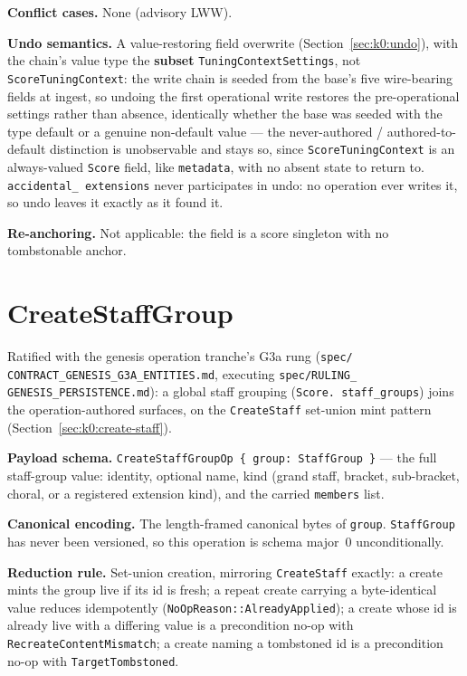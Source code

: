 \documentclass[11pt,letterpaper]{report}
\begin{document}
\textbf{Conflict cases.} None (advisory LWW).

\textbf{Undo semantics.} A value-restoring field overwrite
(Section~\ref{sec:k0:undo}), with the chain's value type the \textbf{subset}
\texttt{TuningContextSettings}, not \texttt{ScoreTuningContext}: the write
chain is seeded from the base's five wire-bearing fields at ingest, so
undoing the first operational write restores the pre-operational settings
rather than absence, identically whether the base was seeded with the type
default or a genuine non-default value --- the never-authored /
authored-to-default distinction is unobservable and stays so, since
\texttt{ScoreTuningContext} is an always-valued \texttt{Score} field, like
\texttt{metadata}, with no absent state to return to. \texttt{accidental\_
extensions} never participates in undo: no operation ever writes it, so
undo leaves it exactly as it found it.

\textbf{Re-anchoring.} Not applicable: the field is a score singleton with no
tombstonable anchor.

\section{CreateStaffGroup}
\label{sec:k0:create-staff-group}

Ratified with the genesis operation tranche's G3a rung (\texttt{spec/
CONTRACT\_GENESIS\_G3A\_ENTITIES.md}, executing \texttt{spec/RULING\_
GENESIS\_PERSISTENCE.md}): a global staff grouping (\texttt{Score.
staff\_groups}) joins the operation-authored surfaces, on the
\texttt{CreateStaff} set-union mint pattern (Section~\ref{sec:k0:create-staff}).

\textbf{Payload schema.} \texttt{CreateStaffGroupOp \{ group: StaffGroup \}}
--- the full staff-group value: identity, optional name, kind (grand staff,
bracket, sub-bracket, choral, or a registered extension kind), and the
carried \texttt{members} list.

\textbf{Canonical encoding.} The length-framed canonical bytes of
\texttt{group}. \texttt{StaffGroup} has never been versioned, so this
operation is schema major~0 unconditionally.

\textbf{Reduction rule.} Set-union creation, mirroring \texttt{CreateStaff}
exactly: a create mints the group live if its id is fresh; a repeat create
carrying a byte-identical value reduces idempotently
(\texttt{NoOpReason::AlreadyApplied}); a create whose id is already live with
a differing value is a precondition no-op with \texttt{RecreateContentMismatch};
a create naming a tombstoned id is a precondition no-op with
\texttt{TargetTombstoned}.
\end{document}
